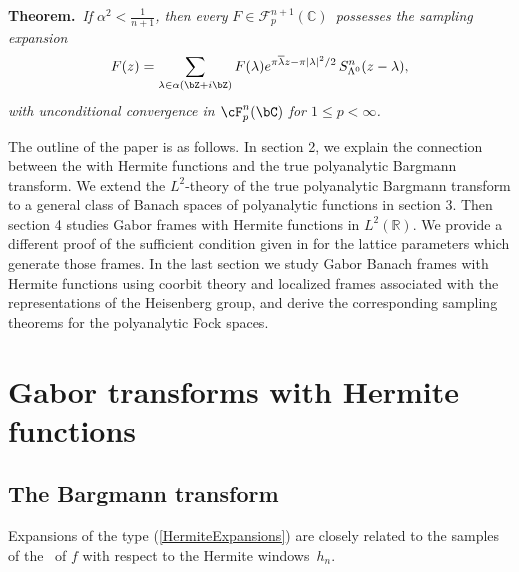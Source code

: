 \documentclass[12pt]{amsart}
\theoremstyle{plain}
\numberwithin{equation}{section}
\begin{document}
\textbf{Theorem.}\emph{\ If }$\alpha ^2 <\frac{1}{n+1}$\emph{, then every }$%
F\in \mathcal{F}_{p}^{n+1}(%
\mathbb{C}
)$\emph{\ possesses the sampling expansion}%
\begin{equation*}
F(z)=\sum_{\lambda \in \alpha (\bZ +i\bZ )} F(\lambda )e^{\pi \overline{%
\lambda }z-\pi \left\vert \lambda \right\vert ^{2}/2} \, S_{\Lambda ^0
}^{n}(z-\lambda ),
\end{equation*}%
\emph{with unconditional convergence in $\cF ^n_p(\bC )$ for $1\leq p<\infty 
$. }

\vspace{ 3 mm}

The outline of the paper is as follows. In section 2, we explain the
connection between the \stft with Hermite functions and the true
polyanalytic Bargmann transform. We extend the $L^{2}$-theory of the true
polyanalytic Bargmann transform to a general class of Banach spaces of
polyanalytic functions in section 3. Then section 4 studies Gabor frames
with Hermite functions in $L^{2}(%
\mathbb{R}
)$. We provide a different proof of the sufficient condition given in \cite%
{CharlyYura} for the lattice parameters which generate those frames. In the
last section we study Gabor Banach frames with Hermite functions using
coorbit theory and localized frames associated with the representations of
the Heisenberg group, and derive the corresponding sampling theorems for the
polyanalytic Fock spaces.

\section{Gabor transforms with Hermite functions}

\subsection{The Bargmann transform}

Expansions of the type (\ref{HermiteExpansions}) are closely related to the
samples of the \stft\ of $f$ with respect to the Hermite windows\ $h_{n}$.
\end{document}

